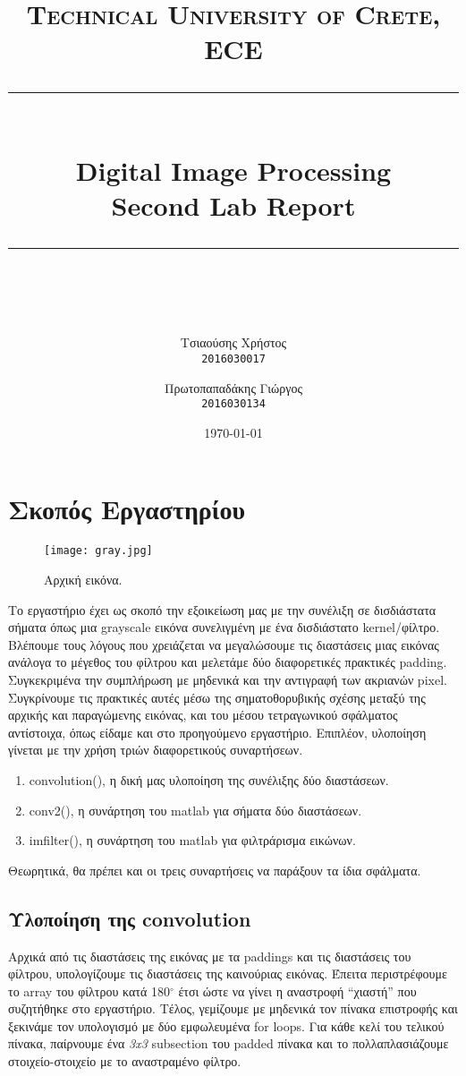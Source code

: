 \documentclass[11pt]{scrartcl} %
\title{
	\normalfont\normalsize
	\textsc{Technical University of Crete, ECE}\\ %
	\vspace{25pt} %
	\rule{\linewidth}{0.5pt}\\ %
	\vspace{20pt} %
	{\Huge Digital Image Processing}\\ %

	{\huge Second Lab Report}\\ %
	\vspace{12pt} %
	\rule{\linewidth}{2pt}\\ %
	\vspace{12pt} %
}
\author{\LARGE{Τσιαούσης Χρήστος}\\
		\texttt{2016030017}
		\and
		\LARGE{Πρωτοπαπαδάκης Γιώργος}\\
		\texttt{2016030134}}%
\date{\normalsize\today} %
\begin{document}
\maketitle %


\section{Σκοπός Εργαστηρίου}

\begin{figure}[h] %
	\centering
	\texttt{[image: gray.jpg]} %
	\caption{Αρχική εικόνα.}
\end{figure}


Το εργαστήριο έχει ως σκοπό την εξοικείωση μας με την συνέλιξη σε δισδιάστατα σήματα όπως μια grayscale εικόνα συνελιγμένη με ένα δισδιάστατο kernel/φίλτρο.
Βλέπουμε τους λόγους που χρειάζεται να μεγαλώσουμε τις διαστάσεις μιας εικόνας ανάλογα το μέγεθος του φίλτρου και μελετάμε δύο διαφορετικές πρακτικές
padding. Συγκεκριμένα την συμπλήρωση με μηδενικά και την αντιγραφή των ακριανών pixel. Συγκρίνουμε τις πρακτικές αυτές μέσω της σηματοθορυβικής
σχέσης μεταξύ της αρχικής και παραγώμενης εικόνας, και του μέσου τετραγωνικού σφάλματος αντίστοιχα, όπως είδαμε και στο προηγούμενο εργαστήριο.
Επιπλέον, υλοποίηση γίνεται με την χρήση τριών διαφορετικούς συναρτήσεων.
\begin{enumerate}
  \item convolution(), η δική μας υλοποίηση της συνέλιξης δύο διαστάσεων.
  \item conv2(), η συνάρτηση του matlab για σήματα δύο διαστάσεων.
  \item imfilter(), η συνάρτηση του matlab για φιλτράρισμα εικώνων.
\end{enumerate}
Θεωρητικά, θα πρέπει και οι τρεις συναρτήσεις να παράξουν τα ίδια σφάλματα.

\subsection{Υλοποίηση της convolution}

Αρχικά από τις διαστάσεις της εικόνας με τα paddings και τις διαστάσεις του φίλτρου, υπολογίζουμε τις διαστάσεις της
καινούριας εικόνας. Έπειτα περιστρέφουμε το array του φίλτρου κατά 180$^{\circ}$ έτσι ώστε να γίνει η αναστροφή ``χιαστή''
που συζητήθηκε στο εργαστήριο. Τέλος, γεμίζουμε με μηδενικά τον πίνακα επιστροφής και ξεκινάμε τον υπολογισμό με δύο
εμφωλευμένα for loops. Για κάθε κελί του τελικού πίνακα, παίρνουμε ένα \textit{3x3} subsection του padded πίνακα και το
πολλαπλασιάζουμε στοιχείο-στοιχείο με το αναστραμένο φίλτρο.
\end{document}
